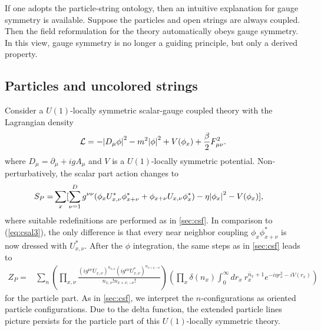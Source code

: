 \documentclass[12pt]{article}
\theoremstyle{definition}
\begin{document}
If one adopts the particle-string ontology, then an intuitive explanation for gauge symmetry is available. Suppose the particles and open strings are always coupled. Then the field reformulation for the theory automatically obeys gauge symmetry. In this view, gauge symmetry is no longer a guiding principle, but only a derived property.

\subsection{Particles and uncolored strings}

Consider a $U(1)$-locally symmetric scalar-gauge coupled theory with the Lagrangian density
\begin{align}
    \mathcal{L}=-\abs{D_\mu \phi}^2-m^2\abs{\phi}^2+V(\phi_x)+\frac{\beta}{2} F_{\mu\nu}^2.
\end{align}
where $D_\mu=\partial_\mu+igA_\mu$ and $V$ is a $U(1)$-locally symmetric potential. Non-perturbatively, the scalar part action changes to
\begin{align}
S_P=& \sum_x [ \sum_{\nu=1}^D g^{\nu\nu}(\phi_x U_{x,\nu}^* \phi^*_{x+\nu} + \phi_{x+\nu} U_{x,\nu} \phi^*_{x} ) -\eta \abs{\phi_x}^2  - V(\phi_x)],\label{eq:csga}
\end{align}
where suitable redefinitions are performed as in \cref{sec:csf}. In comparison to (\ref{eq:csal3}), the only difference is that every near neighbor coupling $\phi_x  \phi^*_{x+\nu}$ is now dressed with $U_{x,\nu}^*$. After the $\phi$ integration, the same steps as in \cref{sec:csf} leads to
\begin{align}\label{eq:ZP}
Z_P=&\sum_{n}(\prod_{x,\nu} \frac{(i g^{\nu\nu}U_{x,\nu} )^{n_{x,\nu}} (ig^{\nu\nu}U_{x,\nu}^* )^{n_{x+\nu,-\nu}}}{n_{x,\nu}! n_{x+\nu,-\nu}!}) (\prod_{x} \delta(n_x) \int_0^\infty dr_x ~ r_x^{\bar{n}_x+1} e^{-i\eta r_x^2-iV(r_x)})
\end{align}
for the particle part. As in \cref{sec:csf}, we interpret the $n$-configurations as oriented particle configurations. Due to the delta function, the extended particle lines picture persists for the particle part of this $U(1)$-locally symmetric theory.
\end{document}

